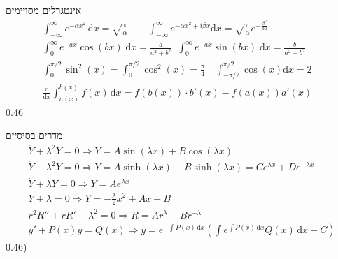     \begin{mytikzbox}{אינטגרלים מסויימים}{
\vspace{-7pt}
\begin{gather*}\int_{-\infty}^\infty e^{-\alpha x^2} \, \mathrm{d}x= \sqrt{ \frac{\pi}{\alpha} }
\qquad 
\int_{-\infty}^{\infty}\!\!\!e^{-\alpha x^{2}+i\beta x}\mathrm{d}x=\sqrt{\frac{\pi}{\alpha}}e^{-\frac{\beta^{2}}{4\alpha}}  \\
\int_0^\infty\!\!\!\!\!\! e^{-ax}\cos(bx) \;\mathrm{d}x = \frac{a}{a^2 + b^2}\;\;\int_0^\infty\!\!\!\!\!\! e^{-ax}\sin(bx) \;\mathrm{d}x = \frac{b}{a^2 + b^2}\\
\int_0^{\pi/2} \sin^2(x)=\int_0^{\pi/2} \cos^2(x)= \frac{\pi}{4}\quad
\int_{-\pi/2}^{\pi/2} \cos\left(x\right) \mathrm{d}x = 2\quad 
\\
\frac{\mathrm{d}}{\mathrm{d}x}\int_{a(x)}^{b(x)} f(x) \, \mathrm{d}x =f(b(x))\cdot b'(x)-f(a(x))a'(x)
\end{gather*}
\vspace{-15pt}
}{0.46}
    \end{mytikzbox}
    \begin{mytikzbox}{מדרים בסיסיים}{
    \vspace{-10pt}
    \begin{gather*}
\ddot{Y}+\lambda^2 Y=0 \Rightarrow Y=A\sin\left( \lambda x \right)+B\cos\left( \lambda x \right) \\
\ddot{Y}\!-\!\lambda^2 Y\!=\!0\!\!\Rightarrow\!\! Y\!=\!A\sinh\left( \lambda x \right)\!+\!B\sinh\left( \lambda x \right)\!=\!Ce^{\lambda x}\!\!+\!De^{-\lambda x} 
\\
\dot{Y}+\lambda Y = 0 \Rightarrow Y= Ae^{\lambda x}
\\
\ddot{Y}+\lambda =0\Rightarrow Y=-\frac{\lambda}{2} x^2+Ax+B\\
r^2R''+rR'-\lambda^2 = 0\Rightarrow R = Ar^{\lambda}+Br^{-\lambda}\\
\!\!y'\!+\!P(x)y \!=\! Q(x) \!\Rightarrow\! y \!=\! e^{-\int P(x)\,\mathrm{d}x}\left( \int e^{\int P(x)\,\mathrm{d}x}Q(x)\,\mathrm{d}x + C \right)
\end{gather*}\vspace{-13pt}
}{0.46})
    \end{mytikzbox}